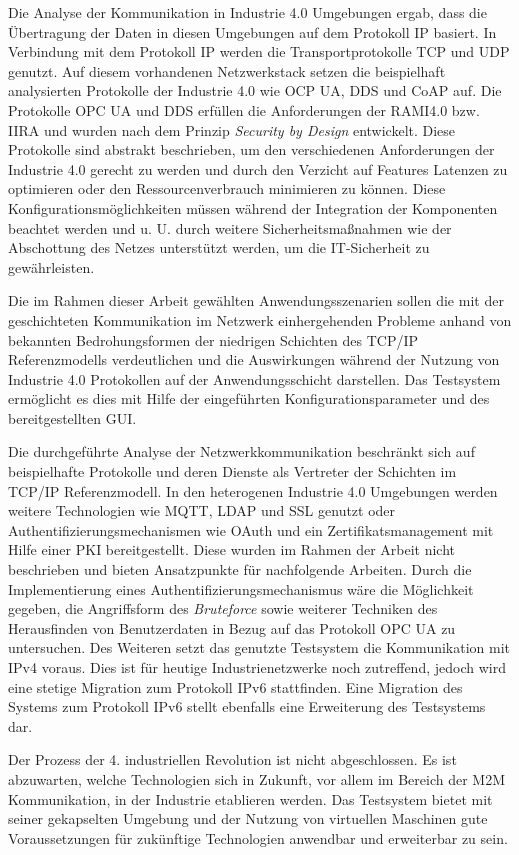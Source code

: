 Die Analyse der Kommunikation in Industrie 4.0 Umgebungen ergab, dass die Übertragung der Daten in diesen Umgebungen auf dem Protokoll \ac{IP} basiert. In Verbindung mit dem Protokoll \ac{IP} werden die Transportprotokolle \ac{TCP} und \ac{UDP} genutzt. Auf diesem vorhandenen Netzwerkstack setzen die beispielhaft analysierten Protokolle der Industrie 4.0 wie \ac{OCP UA}, \ac{DDS} und \ac{CoAP} auf. Die Protokolle \ac{OPC UA} und \ac{DDS} erfüllen die Anforderungen der \ac{RAMI4.0} bzw. \ac{IIRA} und wurden nach dem Prinzip \textit{Security by Design} entwickelt. Diese Protokolle sind abstrakt beschrieben, um den verschiedenen Anforderungen der Industrie 4.0 gerecht zu werden und durch den Verzicht auf Features Latenzen zu optimieren oder den Ressourcenverbrauch minimieren zu können. Diese Konfigurationsmöglichkeiten müssen während der Integration der Komponenten beachtet werden und u. U. durch weitere Sicherheitsmaßnahmen wie der Abschottung des Netzes unterstützt werden, um die \ac{IT}-Sicherheit zu gewährleisten.

Die im Rahmen dieser Arbeit gewählten Anwendungsszenarien sollen die mit der geschichteten Kommunikation im Netzwerk einhergehenden Probleme anhand von bekannten Bedrohungsformen der niedrigen Schichten des \ac{TCP}/\ac{IP} Referenzmodells verdeutlichen und die Auswirkungen während der Nutzung von Industrie 4.0 Protokollen auf der Anwendungsschicht darstellen. Das Testsystem ermöglicht es dies mit Hilfe der eingeführten Konfigurationsparameter und des bereitgestellten \ac{GUI}.

Die durchgeführte Analyse der Netzwerkkommunikation beschränkt sich auf beispielhafte Protokolle und deren Dienste als Vertreter der Schichten im \ac{TCP}/\ac{IP} Referenzmodell. In den heterogenen Industrie 4.0 Umgebungen werden weitere Technologien wie \ac{MQTT}, \ac{LDAP} und \ac{SSL} genutzt oder Authentifizierungsmechanismen wie \ac{OAuth} und ein Zertifikatsmanagement mit Hilfe einer \ac{PKI} bereitgestellt. Diese wurden im Rahmen der Arbeit nicht beschrieben und bieten Ansatzpunkte für nachfolgende Arbeiten. Durch die Implementierung eines Authentifizierungsmechanismus wäre die Möglichkeit gegeben, die Angriffsform des \textit{Bruteforce} sowie weiterer Techniken des Herausfinden von Benutzerdaten in Bezug auf das Protokoll \ac{OPC UA} zu untersuchen. Des Weiteren setzt das genutzte Testsystem die Kommunikation mit \ac{IP}v4 voraus. Dies ist für heutige Industrienetzwerke noch zutreffend, jedoch wird eine stetige Migration zum Protokoll \ac{IP}v6 stattfinden. Eine Migration des Systems zum Protokoll \ac{IP}v6 stellt ebenfalls eine Erweiterung des Testsystems dar.

Der Prozess der 4. industriellen Revolution ist nicht abgeschlossen. Es ist abzuwarten, welche Technologien sich in Zukunft, vor allem im Bereich der \ac{M2M} Kommunikation, in der Industrie etablieren werden. Das Testsystem bietet mit seiner gekapselten Umgebung und der Nutzung von virtuellen Maschinen gute Voraussetzungen für zukünftige Technologien anwendbar und erweiterbar zu sein.
